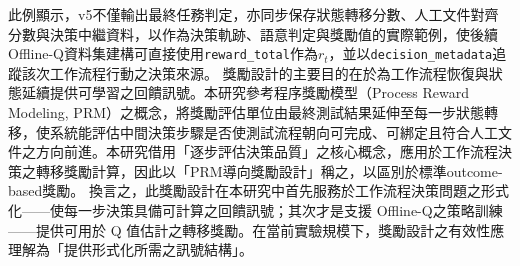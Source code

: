 \begin{ZhChapter}
\text 此例顯示，v5不僅輸出最終任務判定，亦同步保存狀態轉移分數、人工文件對齊分數與決策中繼資料，以作為決策軌跡、語意判定與獎勵值的實際範例，使後續Offline-Q資料集建構可直接使用\texttt{reward\_total}作為$r_t$，並以\texttt{decision\_metadata}追蹤該次工作流程行動之決策來源。
\text 獎勵設計的主要目的在於為工作流程恢復與狀態延續提供可學習之回饋訊號。本研究參考程序獎勵模型（Process Reward Modeling, PRM）之概念，將獎勵評估單位由最終測試結果延伸至每一步狀態轉移，使系統能評估中間決策步驟是否使測試流程朝向可完成、可綁定且符合人工文件之方向前進。本研究借用「逐步評估決策品質」之核心概念，應用於工作流程決策之轉移獎勵計算，因此以「PRM導向獎勵設計」稱之，以區別於標準outcome-based獎勵。
\text 換言之，此獎勵設計在本研究中首先服務於工作流程決策問題之形式化——使每一步決策具備可計算之回饋訊號；其次才是支援 Offline-Q之策略訓練——提供可用於 Q 值估計之轉移獎勵。在當前實驗規模下，獎勵設計之有效性應理解為「提供形式化所需之訊號結構」。
\end{ZhChapter}
